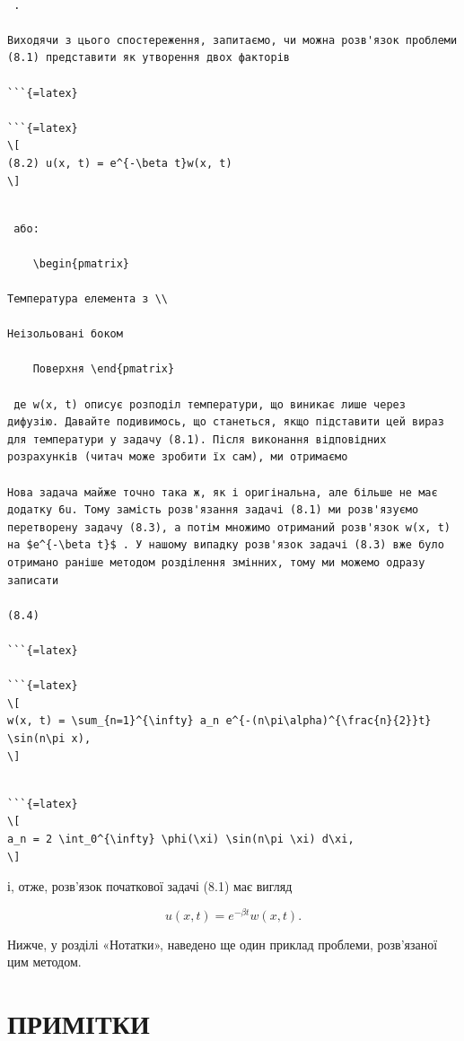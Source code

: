\documentclass[
  ukrainian,
]{article}
\begin{document}
\begin{verbatim}

 .

Виходячи з цього спостереження, запитаємо, чи можна розв'язок проблеми (8.1) представити як утворення двох факторів

```{=latex}

```{=latex}
\[
(8.2) u(x, t) = e^{-\beta t}w(x, t)
\]
\end{verbatim}

\begin{verbatim}

 або:

    \begin{pmatrix}

Температура елемента з \\

Неізольовані боком

    Поверхня \end{pmatrix}

 де w(x, t) описує розподіл температури, що виникає лише через дифузію. Давайте подивимось, що станеться, якщо підставити цей вираз для температури у задачу (8.1). Після виконання відповідних розрахунків (читач може зробити їх сам), ми отримаємо

Нова задача майже точно така ж, як і оригінальна, але більше не має додатку 6u. Тому замість розв'язання задачі (8.1) ми розв'язуємо перетворену задачу (8.3), а потім множимо отриманий розв'язок w(x, t) на $e^{-\beta t}$ . У нашому випадку розв'язок задачі (8.3) вже було отримано раніше методом розділення змінних, тому ми можемо одразу записати

(8.4)

```{=latex}

```{=latex}
\[
w(x, t) = \sum_{n=1}^{\infty} a_n e^{-(n\pi\alpha)^{\frac{n}{2}}t} \sin(n\pi x),
\]
\end{verbatim}

\begin{verbatim}

```{=latex}
\[
a_n = 2 \int_0^{\infty} \phi(\xi) \sin(n\pi \xi) d\xi,
\]
\end{verbatim}

і, отже, розв'язок початкової задачі (8.1) має вигляд

\[
u(x, t) = e^{-\beta t}w(x, t).
\]

Нижче, у розділі «Нотатки», наведено ще один приклад проблеми,
розв'язаної цим методом.

\section{ПРИМІТКИ}\label{ux43fux440ux438ux43cux456ux442ux43aux438-1}
\end{document}
